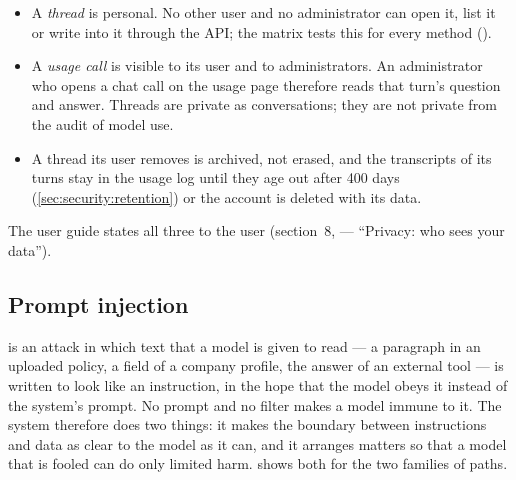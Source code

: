 \begin{itemize}
  \item A \emph{thread} is personal. No other user and no administrator can open it, list it
    or write into it through the API; the matrix tests this for every method
    ().
  \item A \emph{usage call} is visible to its user and to administrators. An administrator
    who opens a chat call on the usage page therefore reads that turn's question and answer.
    Threads are private as conversations; they are not private from the audit of model use.
  \item A thread its user removes is archived, not erased, and the transcripts of its turns
    stay in the usage log until they age out after 400 days (\cref{sec:security:retention})
    or the account is deleted with its data.
\end{itemize}

The user guide states all three to the user (section~8,  --- \enquote{Privacy: who sees your data}).

\subsection{Prompt injection}\label{sec:security:ai:injection}

 is an attack in which text that a model is given to read --- a
paragraph in an uploaded policy, a field of a company profile, the answer of an external
tool --- is written to look like an instruction, in the hope that the model obeys it instead
of the system's prompt. No prompt and no filter makes a model immune to it. The system
therefore does two things: it makes the boundary between instructions and data as clear to
the model as it can, and it arranges matters so that a model that is fooled can do only
limited harm.  shows both for the two families of paths.

